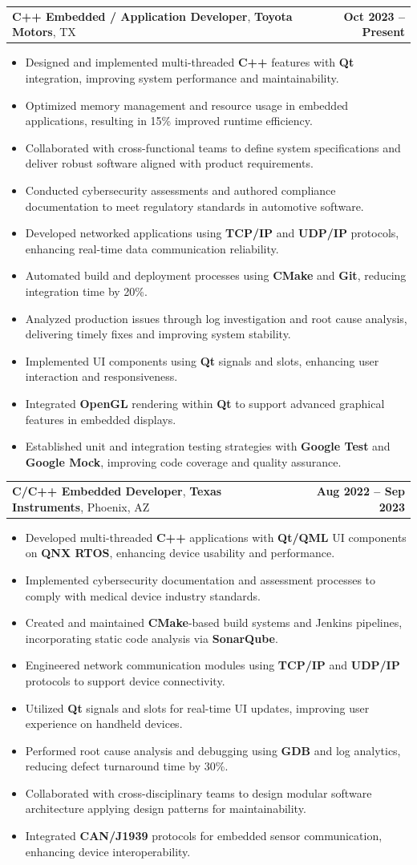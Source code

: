 \documentclass[letterpaper,11pt]{article}
\makeatletter
\newcommand{\resumeItem}[1]{
  \item\footnotesize{
    {#1 \vspace{-2pt}}
  }
}
\newcommand{\resumeSubheading}[4]{
  \vspace{-2pt}\item
    \begin{tabular*}{1.0\textwidth}[t]{l@{\extracolsep{\fill}}r}
      \textbf{\fontsize{10pt}{14pt}\selectfont #3}, \textbf{\fontsize{10pt}{14pt}\selectfont #1}, \fontsize{10pt}{14pt}\selectfont #4 & \textbf{\fontsize{10pt}{14pt}\selectfont #2} \\
    \end{tabular*}\vspace{-7pt}
}
\newcommand{\resumeItemListStart}{\begin{itemize}[leftmargin=*]}
\newcommand{\resumeItemListEnd}{\end{itemize}\vspace{-5pt}}
\makeatother
\begin{document}
    \resumeSubheading
        {Toyota Motors}{Oct 2023 -- Present}
        {C++ Embedded / Application Developer}{TX}
      \resumeItemListStart
        \resumeItem{Designed and implemented multi-threaded \textbf{C++} features with \textbf{Qt} integration, improving system performance and maintainability.}
        \resumeItem{Optimized memory management and resource usage in embedded applications, resulting in 15\% improved runtime efficiency.}
        \resumeItem{Collaborated with cross-functional teams to define system specifications and deliver robust software aligned with product requirements.}
        \resumeItem{Conducted cybersecurity assessments and authored compliance documentation to meet regulatory standards in automotive software.}
        \resumeItem{Developed networked applications using \textbf{TCP/IP} and \textbf{UDP/IP} protocols, enhancing real-time data communication reliability.}
        \resumeItem{Automated build and deployment processes using \textbf{CMake} and \textbf{Git}, reducing integration time by 20\%.}
        \resumeItem{Analyzed production issues through log investigation and root cause analysis, delivering timely fixes and improving system stability.}
        \resumeItem{Implemented UI components using \textbf{Qt} signals and slots, enhancing user interaction and responsiveness.}
        \resumeItem{Integrated \textbf{OpenGL} rendering within \textbf{Qt} to support advanced graphical features in embedded displays.}
        \resumeItem{Established unit and integration testing strategies with \textbf{Google Test} and \textbf{Google Mock}, improving code coverage and quality assurance.}
      \resumeItemListEnd

    \resumeSubheading
        {Texas Instruments}{Aug 2022 -- Sep 2023}
        {C/C++ Embedded Developer}{Phoenix, AZ}
      \resumeItemListStart
        \resumeItem{Developed multi-threaded \textbf{C++} applications with \textbf{Qt/QML} UI components on \textbf{QNX RTOS}, enhancing device usability and performance.}
        \resumeItem{Implemented cybersecurity documentation and assessment processes to comply with medical device industry standards.}
        \resumeItem{Created and maintained \textbf{CMake}-based build systems and Jenkins pipelines, incorporating static code analysis via \textbf{SonarQube}.}
        \resumeItem{Engineered network communication modules using \textbf{TCP/IP} and \textbf{UDP/IP} protocols to support device connectivity.}
        \resumeItem{Utilized \textbf{Qt} signals and slots for real-time UI updates, improving user experience on handheld devices.}
        \resumeItem{Performed root cause analysis and debugging using \textbf{GDB} and log analytics, reducing defect turnaround time by 30\%.}
        \resumeItem{Collaborated with cross-disciplinary teams to design modular software architecture applying design patterns for maintainability.}
        \resumeItem{Integrated \textbf{CAN/J1939} protocols for embedded sensor communication, enhancing device interoperability.}
      \resumeItemListEnd
\end{document}
